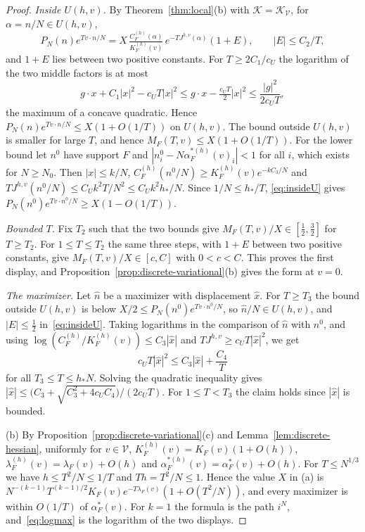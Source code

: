 \begin{proof}
\emph{Inside $U(h,v)$.} By Theorem~\ref{thm:local}(b) with
$\mathcal K=\mathcal K_{\mathcal V}$, for $\alpha=n/N\in U(h,v)$,
\begin{equation}\label{eq:insideU}
P_N(n)e^{Tv\cdot n/N}=X\,\tfrac{C^{(h)}_F(\alpha)}{K^{(h)}_F(v)}\,e^{-TJ^{h,v}(\alpha)}(1+E),
\qquad|E|\le C_2/T,
\end{equation}
and $1+E$ lies between two positive constants. For $T\ge2C_1/c_U$ the logarithm of
the two middle factors is at most
\[
g\cdot x+C_1|x|^2-c_UT|x|^2\le g\cdot x-\tfrac{c_UT}2|x|^2\le\frac{|g|^2}{2c_UT},
\]
the maximum of a concave quadratic. Hence $P_N(n)e^{Tv\cdot n/N}\le X(1+O(1/T))$ on
$U(h,v)$. The bound outside $U(h,v)$ is smaller for large $T$, and hence
$M_F(T,v)\le X(1+O(1/T))$. For the lower bound let $n^0$ have support $F$ and
$|n^0_i-N\alpha^{*(h)}_F(v)_i|<1$ for all $i$, which exists for $N\ge N_0$. Then
$|x|\le k/N$, $C^{(h)}_F(n^0/N)\ge K^{(h)}_F(v)e^{-kC_3/N}$ and
$TJ^{h,v}(n^0/N)\le C_Uk^2T/N^2\le C_Uk^2h_*/N$. Since $1/N\le h_*/T$,
\eqref{eq:insideU} gives $P_N(n^0)e^{Tv\cdot n^0/N}\ge X(1-O(1/T))$.

\emph{Bounded $T$.} Fix $T_2$ such that the two bounds give
$M_F(T,v)/X\in[\frac12,\frac32]$ for $T\ge T_2$. For $1\le T\le T_2$ the same three
steps, with $1+E$ between two positive constants, give $M_F(T,v)/X\in[c,C]$ with
$0<c<C$. This proves the first display, and Proposition~\ref{prop:discrete-variational}(b)
gives the form at $v=0$.

\emph{The maximizer.} Let $\hat n$ be a maximizer with displacement $\hat x$. For
$T\ge T_3$ the bound outside $U(h,v)$ is below $X/2\le P_N(n^0)e^{Tv\cdot n^0/N}$, so
$\hat n/N\in U(h,v)$, and $|E|\le\frac12$ in~\eqref{eq:insideU}. Taking logarithms in
the comparison of $\hat n$ with $n^0$, and using
$\log(C^{(h)}_F/K^{(h)}_F(v))\le C_3|\hat x|$ and $TJ^{h,v}\ge c_UT|\hat x|^2$, we get
\[
c_UT|\hat x|^2\le C_3|\hat x|+\frac{C_4}T
\]
for all $T_3\le T\le h_*N$. Solving the quadratic inequality gives
$|\hat x|\le\bigl(C_3+\sqrt{C_3^2+4c_UC_4}\bigr)/(2c_UT)$. For $1\le T<T_3$ the claim
holds since $|\hat x|$ is bounded.

(b) By Proposition~\ref{prop:discrete-variational}(c) and
Lemma~\ref{lem:discrete-hessian}, uniformly for $v\in\mathcal V$,
$K^{(h)}_F(v)=K_F(v)(1+O(h))$, $\lambda^{(h)}_F(v)=\lambda_F(v)+O(h)$ and
$\alpha^{*(h)}_F(v)=\alpha^*_F(v)+O(h)$. For $T\le N^{1/3}$ we have
$h\le T^2/N\le1/T$ and $Th=T^2/N\le1$. Hence the value $X$ in (a) is
$N^{-(k-1)}T^{(k-1)/2}K_F(v)e^{-T\lambda_F(v)}(1+O(T^2/N))$, and every maximizer is
within $O(1/T)$ of $\alpha^*_F(v)$. For $k=1$ the formula is the path $i^N$,
and~\eqref{eq:logmax} is the logarithm of the two displays.


\end{proof}
